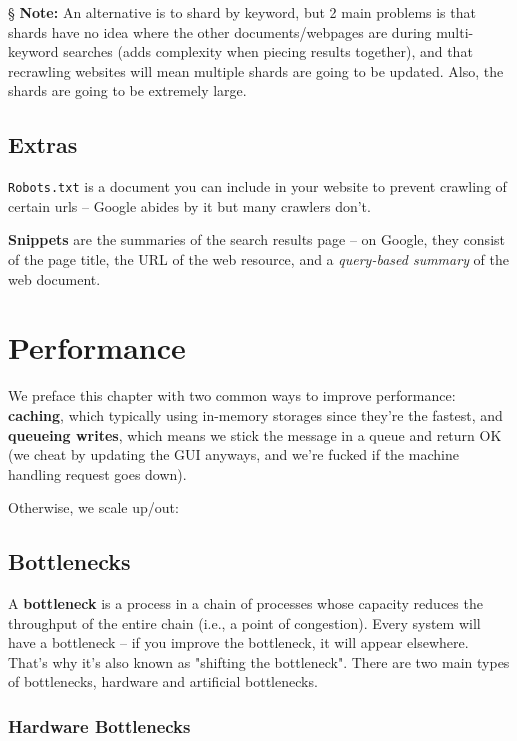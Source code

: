 \documentclass{report}
\newcommand{\npar}{\par\noindent}
\newcommand{\vpar}{\vspace{1em}\npar}
\newcommand{\note}{\vpar \S \textbf{ Note: }}
\begin{document}
\note An alternative is to shard by keyword, but 2 main problems is that shards have no idea where the other documents/webpages are during multi-keyword searches (adds complexity when piecing results together), and that recrawling websites will mean multiple shards are going to be updated. Also, the shards are going to be extremely large.

\section{Extras}

\par \verb|Robots.txt| is a document you can include in your website to prevent crawling of certain urls -- Google abides by it but many crawlers don't.

\vpar \textbf{Snippets} are the summaries of the search results page -- on Google, they consist of the page title, the URL of the web resource, and a \textit{query-based summary} of the web document.

\chapter{Performance}

\par We preface this chapter with two common ways to improve performance: \textbf{caching}, which typically using in-memory storages since they're the fastest, and \textbf{queueing writes}, which means we stick the message in a queue and return OK (we cheat by updating the GUI anyways, and we're fucked if the machine handling request goes down).

\vpar Otherwise, we scale up/out:

\section{Bottlenecks}

\par A \textbf{bottleneck} is a process in a chain of processes whose capacity reduces the throughput of the entire chain (i.e., a point of congestion). Every system will have a bottleneck -- if you improve the bottleneck, it will appear elsewhere. That's why it's also known as "shifting the bottleneck". There are two main types of bottlenecks, hardware and artificial bottlenecks.

\subsection{Hardware Bottlenecks}
\end{document}
